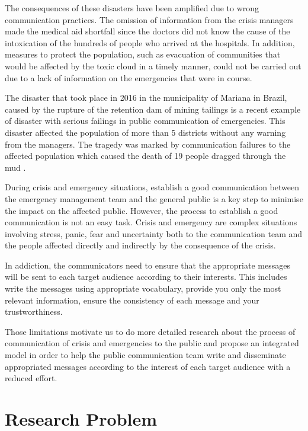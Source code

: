 The consequences of these disasters have been amplified due to wrong communication practices. The omission of information from the crisis managers made the medical aid shortfall since the doctors did not know the cause of the intoxication of the hundreds of people who arrived at the hospitals. In addition, measures to protect the population, such as evacuation of communities that would be affected by the toxic cloud in a timely manner, could not be carried out due to a lack of information on the emergencies that were in course.

The disaster that took place in 2016 in the municipality of Mariana in Brazil, caused by the rupture of the retention dam of mining tailings is a recent example of disaster with serious failings in public communication of emergencies. This disaster affected the population of more than 5 districts without any warning from the managers. The tragedy was marked by communication failures to the affected population which caused the death of 19 people dragged through the mud \cite{escobar2015mud}.


During crisis and emergency situations, establish a good communication between the emergency management team and the general public is a key step to minimise the impact on the affected public. However, the process to establish a good communication is not an easy task. Crisis and emergency are complex situations involving stress, panic, fear and uncertainty \cite{reynolds2007crisis} both to the communication team and the people affected directly and indirectly by the consequence of the crisis.

In addiction, the communicators need to ensure that the appropriate messages will be sent to each target audience according to their interests\cite{panamericanhealthorganization2009}. This includes write the messages using appropriate vocabulary, provide you only the most relevant information, ensure the consistency of each message and your trustworthiness. 


Those limitations motivate us to do more detailed research about the process of communication of crisis and emergencies to the public and propose an integrated model in order to help the public communication team write and disseminate appropriated messages according to the interest of each target audience with a reduced effort.

\section{Research Problem}

